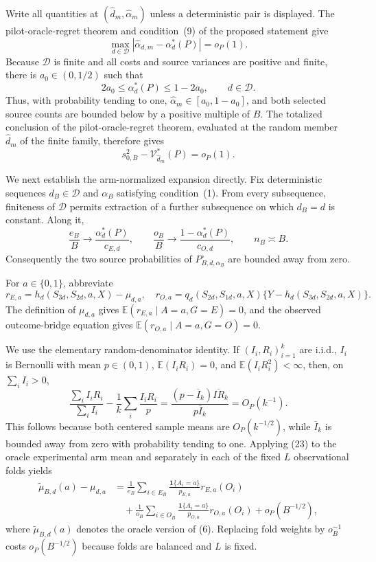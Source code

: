 Write all quantities at \((\widehat d_m,\widehat\alpha_m)\) unless a deterministic pair is displayed. The pilot-oracle-regret theorem and condition~(9) of the proposed statement give
\[
\max_{d\in\mathcal D}|\widehat\alpha_{d,m}-\alpha_d^*(P)|=o_P(1). \tag{18}
\]
Because \(\mathcal D\) is finite and all costs and source variances are positive and finite, there is \(a_0\in(0,1/2)\) such that
\[
2a_0\le\alpha_d^*(P)\le1-2a_0,\qquad d\in\mathcal D. \tag{19}
\]
Thus, with probability tending to one, \(\widehat\alpha_m\in[a_0,1-a_0]\), and both selected source counts are bounded below by a positive multiple of \(B\). The totalized conclusion of the pilot-oracle-regret theorem, evaluated at the random member \(\widehat d_m\) of the finite family, therefore gives
\[
s_{0,B}^2-\mathcal V_{\widehat d_m}^*(P)=o_P(1). \tag{20}
\]

We next establish the arm-normalized expansion directly. Fix deterministic sequences \(d_B\in\mathcal D\) and \(\alpha_B\) satisfying condition~(1). From every subsequence, finiteness of \(\mathcal D\) permits extraction of a further subsequence on which \(d_B=d\) is constant. Along it,
\[
\frac{e_B}{B}\longrightarrow\frac{\alpha_d^*(P)}{c_{E,d}},
\qquad
\frac{o_B}{B}\longrightarrow\frac{1-\alpha_d^*(P)}{c_{O,d}},
\qquad n_B\asymp B. \tag{21}
\]
Consequently the two source probabilities of \(P_{B,d,\alpha_B}^{\circ}\) are bounded away from zero.

For \(a\in\{0,1\}\), abbreviate
\[
r_{E,a}=h_d(S_{3d},S_{2d},a,X)-\mu_{d,a},
\quad
r_{O,a}=q_d(S_{2d},S_{1d},a,X)
\{Y-h_d(S_{3d},S_{2d},a,X)\}. \tag{22}
\]
The definition of \(\mu_{d,a}\) gives
\(\mathbb E(r_{E,a}\mid A=a,G=E)=0\), and the observed outcome-bridge equation gives
\(\mathbb E(r_{O,a}\mid A=a,G=O)=0\).

We use the elementary random-denominator identity. If \((I_i,R_i)_{i=1}^k\) are i.i.d., \(I_i\) is Bernoulli with mean \(p\in(0,1)\), \(\mathbb E(I_iR_i)=0\), and \(\mathbb E(I_iR_i^2)<\infty\), then, on \(\sum_iI_i>0\),
\[
\frac{\sum_iI_iR_i}{\sum_iI_i}
-\frac1k\sum_i\frac{I_iR_i}{p}
=\frac{(p-\overline I_k)\overline{IR}_k}{p\overline I_k}
=O_P(k^{-1}). \tag{23}
\]
This follows because both centered sample means are \(O_P(k^{-1/2})\), while \(\overline I_k\) is bounded away from zero with probability tending to one. Applying (23) to the oracle experimental arm mean and separately in each of the fixed \(L\) observational folds yields
\[
\begin{aligned}
\widetilde\mu_{B,d}(a)-\mu_{d,a}
&=\frac1{e_B}\sum_{i\in E_B}
\frac{\mathbf1\{A_i=a\}}{p_{E,a}}r_{E,a}(O_i)\\
&\quad+\frac1{o_B}\sum_{i\in O_B}
\frac{\mathbf1\{A_i=a\}}{p_{O,a}}r_{O,a}(O_i)
+o_P(B^{-1/2}),
\end{aligned} \tag{24}
\]
where \(\widetilde\mu_{B,d}(a)\) denotes the oracle version of (6). Replacing fold weights by \(o_B^{-1}\) costs \(o_P(B^{-1/2})\) because folds are balanced and \(L\) is fixed.

